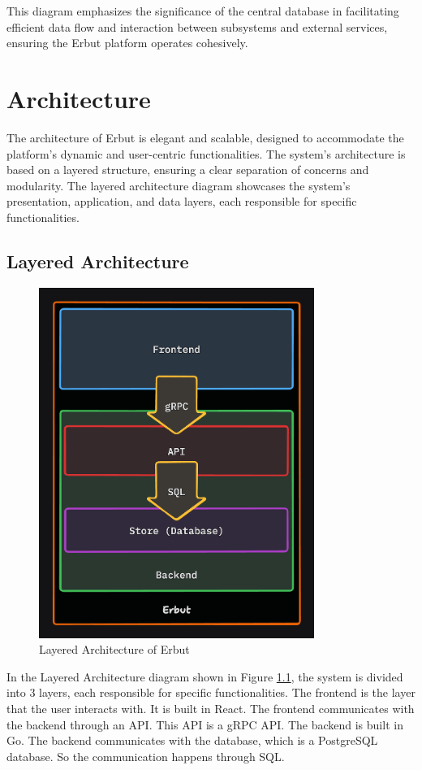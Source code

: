 \documentclass[a4paper]{report}
\begin{document}
This diagram emphasizes the significance of the central database in facilitating efficient data flow and interaction between subsystems and external services, ensuring the Erbut platform operates cohesively.

\chapter{Architecture}

The architecture of Erbut is elegant and scalable, designed to accommodate the platform's dynamic and user-centric functionalities. The system's architecture is based on a layered structure, ensuring a clear separation of concerns and modularity. The layered architecture diagram showcases the system's presentation, application, and data layers, each responsible for specific functionalities.

\section{Layered Architecture}

\begin{figure}[h!]
    \centering
    \includegraphics[width=0.8\textwidth]{images/erbut-layered-architecture.png}
    \caption{Layered Architecture of Erbut}
    \label{fig:layered-architecture}
\end{figure}

In the Layered Architecture diagram shown in Figure \ref{fig:layered-architecture}, the system is divided into 3 layers, each responsible for specific functionalities. The frontend is the layer that the user interacts with. It is built in React. The frontend communicates with the backend through an API. This API is a gRPC API. The backend is built in Go. The backend communicates with the database, which is a PostgreSQL database. So the communication happens through SQL.
\end{document}
